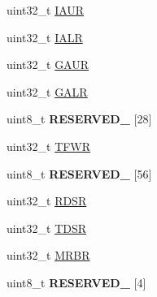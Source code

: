 \begin{DoxyCompactItemize}
\item 
uint32\+\_\+t \hyperlink{struct_e_n_e_t___mem_map_a78ae9799517092522b6fc5da4c66370a}{I\+A\+U\+R}
\item 
uint32\+\_\+t \hyperlink{struct_e_n_e_t___mem_map_a335c5db5d82d1fa32d63ab09d1e81a9f}{I\+A\+L\+R}
\item 
uint32\+\_\+t \hyperlink{struct_e_n_e_t___mem_map_a3806bd6a5c25e5430abb853b48598b4e}{G\+A\+U\+R}
\item 
uint32\+\_\+t \hyperlink{struct_e_n_e_t___mem_map_a66dd66dae8c45fd2658eec6ea05dd7dd}{G\+A\+L\+R}
\item 
\hypertarget{struct_e_n_e_t___mem_map_a9a9a0abff9b08033b64d8c8252208b02}{}uint8\+\_\+t {\bfseries R\+E\+S\+E\+R\+V\+E\+D\+\_} \mbox{[}28\mbox{]}\label{struct_e_n_e_t___mem_map_a9a9a0abff9b08033b64d8c8252208b02}

\item 
uint32\+\_\+t \hyperlink{struct_e_n_e_t___mem_map_aef8b194a94a2a24c0f705e65af5bee24}{T\+F\+W\+R}
\item 
\hypertarget{struct_e_n_e_t___mem_map_a17980d82231c4d8b559eb321370d29ce}{}uint8\+\_\+t {\bfseries R\+E\+S\+E\+R\+V\+E\+D\+\_} \mbox{[}56\mbox{]}\label{struct_e_n_e_t___mem_map_a17980d82231c4d8b559eb321370d29ce}

\item 
uint32\+\_\+t \hyperlink{struct_e_n_e_t___mem_map_a67a90891a4f2cf259db5e9b95b100d60}{R\+D\+S\+R}
\item 
uint32\+\_\+t \hyperlink{struct_e_n_e_t___mem_map_a47f7c6593b849324f2b1eeca43fda4c7}{T\+D\+S\+R}
\item 
uint32\+\_\+t \hyperlink{struct_e_n_e_t___mem_map_ac439e5c3a7baf9471d1eb0b1722f4000}{M\+R\+B\+R}
\item 
\hypertarget{struct_e_n_e_t___mem_map_adb7d6e1d995317d5276f1d60d8eb4523}{}uint8\+\_\+t {\bfseries R\+E\+S\+E\+R\+V\+E\+D\+\_} \mbox{[}4\mbox{]}\label{struct_e_n_e_t___mem_map_adb7d6e1d995317d5276f1d60d8eb4523}


\end{DoxyCompactItemize}
